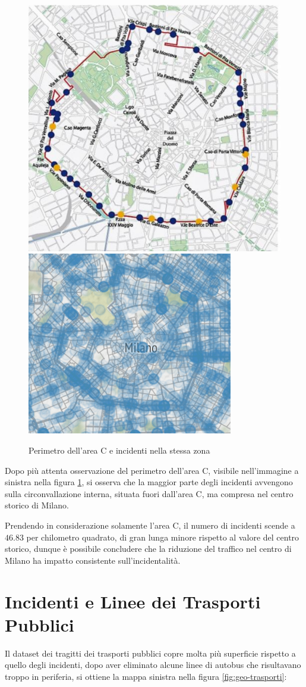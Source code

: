 \documentclass[a4paper,12pt]{report}
\begin{document}
\begin{figure}
    \includegraphics[width=0.48\linewidth]{img/perimetro_area_c.png}
    \includegraphics[width=0.52\linewidth]{../src/area_c/area_c_incidenti.png}
    \caption{Perimetro dell'area C e incidenti nella stessa zona}
    \label{fig:perimetro-area-c}
\end{figure}

Dopo più attenta osservazione del perimetro dell'area C, visibile nell'immagine a sinistra nella 
figura \ref{fig:perimetro-area-c}, si osserva che la maggior parte degli 
incidenti avvengono sulla circonvallazione interna, 
situata fuori dall'area C, ma compresa nel centro storico di Milano.

Prendendo in considerazione solamente l'area C, il numero di incidenti scende a $46.83$ 
per chilometro quadrato, di gran lunga minore rispetto al valore del centro storico, 
dunque è possibile concludere che la riduzione del traffico nel centro di Milano ha impatto 
consistente sull'incidentalità.

\section{Incidenti e Linee dei Trasporti Pubblici}

Il dataset dei tragitti dei trasporti pubblici copre molta più superficie rispetto a 
quello degli incidenti, dopo aver eliminato alcune linee di autobus che risultavano 
troppo in periferia, si ottiene la mappa sinistra nella figura \ref{fig:geo-trasporti}: 
\end{document}
